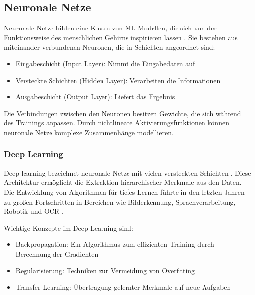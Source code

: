 \subsection{Neuronale Netze}
\label{subsec:neuronale-netze}

Neuronale Netze bilden eine Klasse von \gls{ML}-Modellen, die sich von der Funktionsweise des menschlichen Gehirns inspirieren lassen \parencite{RebalaGopinath2019AItM}. Sie bestehen aus miteinander verbundenen Neuronen, die in Schichten angeordnet sind:

\begin{itemize}
	\item Eingabeschicht (Input Layer): Nimmt die Eingabedaten auf
	\item Versteckte Schichten (Hidden Layer): Verarbeiten die Informationen
	\item Ausgabeschicht (Output Layer): Liefert das Ergebnis
\end{itemize}

Die Verbindungen zwischen den Neuronen besitzen Gewichte, die sich während des Trainings anpassen. Durch nichtlineare Aktivierungsfunktionen können neuronale Netze komplexe Zusammenhänge modellieren.

\subsubsection{Deep Learning}
\label{subsec:deep-learning}

Deep learning bezeichnet neuronale Netze mit vielen versteckten Schichten \parencite{RebalaGopinath2019AItM}. Diese Architektur ermöglicht die Extraktion hierarchischer Merkmale aus den Daten. Die Entwicklung von Algorithmen für tiefes Lernen führte in den letzten Jahren zu großen Fortschritten in Bereichen wie Bilderkennung, Sprachverarbeitung, Robotik und \gls{OCR} \parencite{jordan2015machine}.

Wichtige Konzepte im Deep Learning sind:

\begin{itemize}
	\item Backpropagation: Ein Algorithmus zum effizienten Training durch Berechnung der Gradienten \parencite{RebalaGopinath2019AItM}
	\item Regularisierung: Techniken zur Vermeidung von Overfitting \parencite{jordan2015machine}
	\item Transfer Learning: Übertragung gelernter Merkmale auf neue Aufgaben \parencite{jordan2015machine}
\end{itemize}

